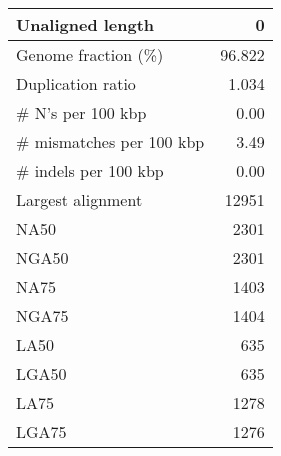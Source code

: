 \documentclass[12pt,a4paper]{article}
\begin{document}
\begin{table}[ht]
\begin{center}
\begin{tabular}{|l*{1}{|r}|}
Unaligned length & 0 \\ \hline
Genome fraction (\%) & 96.822 \\ \hline
Duplication ratio & 1.034 \\ \hline
\# N's per 100 kbp & 0.00 \\ \hline
\# mismatches per 100 kbp & 3.49 \\ \hline
\# indels per 100 kbp & 0.00 \\ \hline
Largest alignment & 12951 \\ \hline
NA50 & 2301 \\ \hline
NGA50 & 2301 \\ \hline
NA75 & 1403 \\ \hline
NGA75 & 1404 \\ \hline
LA50 & 635 \\ \hline
LGA50 & 635 \\ \hline
LA75 & 1278 \\ \hline
LGA75 & 1276 \\ \hline
\end{tabular}
\end{center}
\end{table}
\end{document}
